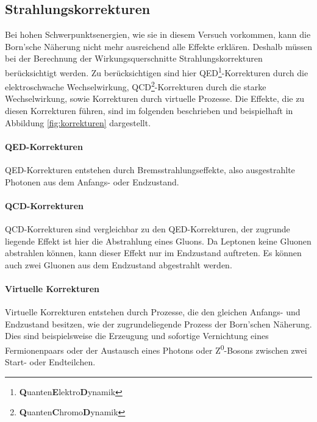 \subsection{Strahlungskorrekturen}
Bei hohen Schwerpunktsenergien, wie sie in diesem Versuch vorkommen, kann die Born'sche Näherung nicht mehr ausreichend alle Effekte erklären. Deshalb müssen bei der Berechnung der Wirkungsquerschnitte Strahlungskorrekturen berücksichtigt werden. Zu berücksichtigen sind hier QED\footnote{\textbf Quanten\textbf Elektro\textbf Dynamik}-Korrekturen durch die elektroschwache Wechselwirkung, QCD\footnote{\textbf Quanten\textbf Chromo\textbf Dynamik}-Korrekturen durch die starke Wechselwirkung, sowie Korrekturen durch virtuelle Prozesse. Die Effekte, die zu diesen Korrekturen führen, sind im folgenden beschrieben und beispielhaft in Abbildung \ref{fig:korrekturen} dargestellt.

\paragraph{QED-Korrekturen}
QED-Korrekturen entstehen durch Bremsstrahlungseffekte, also ausgestrahlte Photonen aus dem Anfangs- oder Endzustand.

\paragraph{QCD-Korrekturen}
QCD-Korrekturen sind vergleichbar zu den QED-Korrekturen, der zugrunde liegende Effekt ist hier die Abstrahlung eines Gluons. Da Leptonen keine Gluonen abstrahlen können, kann dieser Effekt nur im Endzustand auftreten. Es können auch zwei Gluonen aus dem Endzustand abgestrahlt werden.

\paragraph{Virtuelle Korrekturen}
Virtuelle Korrekturen entstehen durch Prozesse, die den gleichen Anfangs- und Endzustand besitzen, wie der zugrundeliegende Prozess der Born'schen Näherung. Dies sind beispielsweise die Erzeugung und sofortige Vernichtung eines Fermionenpaars oder der Austausch eines Photons oder Z\textsuperscript0-Bosons zwischen zwei Start- oder Endteilchen.

